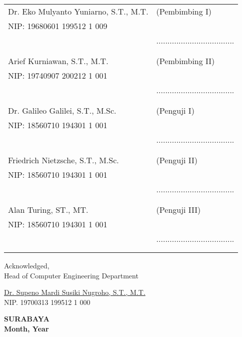     \noindent
    \begin{tabularx}{\textwidth}{X l}
      Dr. Eko Mulyanto Yuniarno, S.T., M.T.          & (Pembimbing I) \\
      NIP: 19680601 199512 1 009        & \\
      & ................................... \\
      &  \\
      &  \\
      Arief Kurniawan, S.T., M.T.     & (Pembimbing II) \\
      NIP: 19740907 200212 1 001        & \\
      & ................................... \\
      &  \\
      &  \\
      Dr. Galileo Galilei, S.T., M.Sc.  & (Penguji I) \\
      NIP: 18560710 194301 1 001        & \\
      & ................................... \\
      &  \\
      &  \\
      Friedrich Nietzsche, S.T., M.Sc.  & (Penguji II) \\
      NIP: 18560710 194301 1 001        & \\
      & ................................... \\
      &  \\
      &  \\
      Alan Turing, ST., MT.             & (Penguji III) \\
      NIP: 18560710 194301 1 001        & \\
      & ................................... \\
      &  \\
      &  \\
    \end{tabularx}
  \endgroup


  \begin{center}
    Acknowledged, \\
    Head of Computer Engineering Department\\

    \vspace{8ex}

    \underline{Dr. Supeno Mardi Susiki Nugroho, S.T., M.T.} \\
    NIP. 19700313 199512 1 000
  \end{center}

  \begin{center}
    \textbf{SURABAYA\\Month, Year}
  \end{center}
\endgroup

